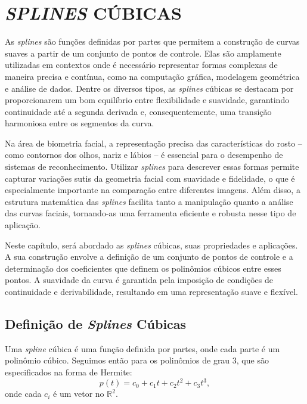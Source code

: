 \chapter{\textit{SPLINES} CÚBICAS} \label{cha:splines}

As \textit{splines} são funções definidas por partes que permitem a construção de curvas suaves a partir de um conjunto de pontos de controle. Elas são amplamente utilizadas em contextos onde é necessário representar formas complexas de maneira precisa e contínua, como na computação gráfica, modelagem geométrica e análise de dados. Dentre os diversos tipos, as \textit{splines} cúbicas se destacam por proporcionarem um bom equilíbrio entre flexibilidade e suavidade, garantindo continuidade até a segunda derivada e, consequentemente, uma transição harmoniosa entre os segmentos da curva.

Na área de biometria facial, a representação precisa das características do rosto -- como contornos dos olhos, nariz e lábios -- é essencial para o desempenho de sistemas de reconhecimento. Utilizar \textit{splines} para descrever essas formas permite capturar variações sutis da geometria facial com suavidade e fidelidade, o que é especialmente importante na comparação entre diferentes imagens. Além disso, a estrutura matemática das \textit{splines} facilita tanto a manipulação quanto a análise das curvas faciais, tornando-as uma ferramenta eficiente e robusta nesse tipo de aplicação.

Neste capítulo, será abordado as \textit{splines} cúbicas, suas propriedades e aplicações. A sua construção envolve a definição de um conjunto de pontos de controle e a determinação dos coeficientes que definem os polinômios cúbicos entre esses pontos. A suavidade da curva é garantida pela imposição de condições de continuidade e derivabilidade, resultando em uma representação suave e flexível.

\section{Definição de \textit{Splines} Cúbicas}
\label{sec:definicao-splines-cubicas}
Uma \textit{spline} cúbica é uma função definida por partes, onde cada parte é um polinômio cúbico. Seguimos então para os polinômios de grau 3, que são especificados na forma de Hermite:
\begin{equation}
    p(t) = c_0 + c_1t + c_2t^2 + c_3t^3,
\end{equation}
onde cada $c_i$ é um vetor no $\mathbb{R}^2$.

